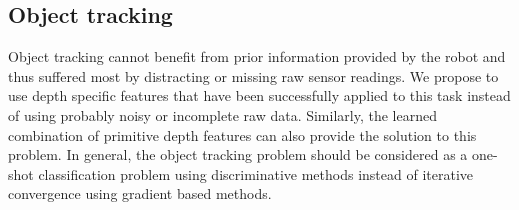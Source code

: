 \subsection{Object tracking}

Object tracking cannot benefit from prior information provided by the robot and thus suffered most by distracting or missing raw sensor readings. We propose to use depth specific features that have been successfully applied to this task instead of using probably noisy or incomplete raw data. Similarly, the learned combination of primitive depth features can also provide the solution to this problem. In general, the object tracking problem should be considered as a one-shot classification problem using discriminative methods instead of iterative convergence using gradient based methods.

